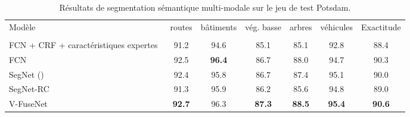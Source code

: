 \begin{table}
    \caption{Résultats de segmentation sémantique multi-modale sur le jeu de test  Potsdam.}
    \label{table:final_potsdam}
    \setlength\tabcolsep{4pt}
	\begin{tabularx}{\textwidth}{Y c c c c c c}
    \toprule
  	Modèle & routes & bâtiments & vég. basse & arbres & véhicules & Exactitude\\\\
    \midrule
    FCN + CRF + caractéristiques expertes~\cite{liu_dense_2017} & 91.2 & 94.6 & 85.1 & 85.1 & 92.8 & 88.4\\
    FCN~\cite{sherrah_fully_2016} & 92.5 & \textbf{96.4} & 86.7 & 88.0 & 94.7 & 90.3\\
    \midrule
    SegNet () & 92.4 & 95.8 & 86.7 & 87.4 & 95.1 & 90.0\\
	  SegNet-RC & 91.3 & 95.9 & 86.2 & 85.6 & 94.8 & 89.0\\
    V-FuseNet & \textbf{92.7} & 96.3 & \textbf{87.3} & \textbf{88.5} & \textbf{95.4} & \textbf{90.6}\\
    \bottomrule
    \end{tabularx}
\end{table}


